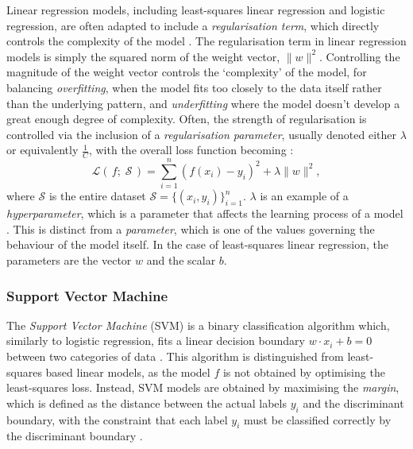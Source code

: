 \documentclass{report}
\begin{document}
Linear regression models, including least-squares linear regression and logistic regression, are often adapted to include a \textit{regularisation term}, which directly controls the complexity of the model \cite{hastie2009elements}. The regularisation term in linear regression models is simply the squared norm of the weight vector, $\lVert w \rVert^2$. Controlling the magnitude of the weight vector controls the `complexity' of the model, for balancing \textit{overfitting}, when the model fits too closely to the data itself rather than the underlying pattern, and \textit{underfitting} where the model doesn't develop a great enough degree of complexity. Often, the strength of regularisation is controlled via the inclusion of a \textit{regularisation parameter}, usually denoted either $\lambda$ or equivalently $\frac{1}{C}$, with the overall loss function becoming \cite{hastie2009elements}:
\begin{equation}
    \mathcal L(\,f; \;\mathcal S\,) = \sum_{i=1}^n (f(x_i) - y_i)^2 + \lambda \lVert w \rVert^2,
\end{equation}
where $\mathcal S$ is the entire dataset $\mathcal S = \{(x_i, y_i)\}_{i=1}^n$.
$\lambda$ is an example of a \textit{hyperparameter}, which is a parameter that affects the learning process of a model \cite{hastie2009elements}. This is distinct from a \textit{parameter}, which is one of the values governing the behaviour of the model itself. In the case of least-squares linear regression, the parameters are the vector $w$ and the scalar $b$.


\subsubsection{Support Vector Machine}

The \textit{Support Vector Machine} (SVM) is a binary classification algorithm which, similarly to logistic regression, fits a linear decision boundary $w \cdot x_i + b = 0$ between two categories of data \cite{hastie2009elements}. This algorithm is distinguished from least-squares based linear models, as the model $f$ is not obtained by optimising the least-squares loss. Instead, SVM models are obtained by maximising the \textit{margin}, which is defined as the distance between the actual labels $y_i$ and the discriminant boundary, with the constraint that each label $y_i$ must be classified correctly by the discriminant boundary \cite{hastie2009elements}. 
\end{document}
